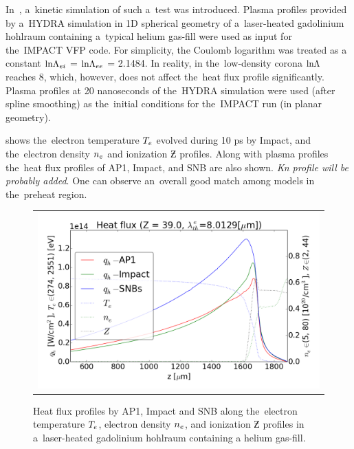 In~\cite{Brodrick_PoP2017}, a~kinetic simulation of such a~test was introduced.
Plasma profiles provided by a~HYDRA simulation in 1D spherical
geometry of a~laser-heated gadolinium hohlraum containing a~typical helium 
gas-fill were used as input for the~IMPACT \cite{Kingham_JCP2004} VFP code.  
For simplicity, the Coulomb logarithm was treated as a
constant $\text{ln}\Lambda_{ei}$ = $\text{ln}\Lambda_{ee}$ = 2.1484. In reality, in the~low-density 
corona $\text{ln}\Lambda$ reaches 8, which, however, does not affect the~heat flux profile 
significantly. Plasma profiles at 20 nanoseconds of the~HYDRA simulation 
were used (after spline smoothing) as the~initial conditions for 
the~IMPACT run (in planar geometry).

 shows the~electron temperature $T_e$ 
evolved during 10 ps by Impact, and the~electron density $n_e$ and 
ionization $\Zbar$ profiles. Along with plasma profiles the~heat flux profiles
of AP1, Impact, and SNB are also shown. 
\textit{Kn profile will be probably added}. One can observe an~overall good
match among models in the~preheat region.

\begin{figure}[tbh]
  \begin{center}
    \begin{tabular}{c}
      \includegraphics[width=\figscale\textwidth]{../VFPdata/GD_Hohlraum/fluxes_10ps.png} 
    \end{tabular}
  \caption{
  Heat flux profiles by AP1, Impact and SNB along 
  the~electron temperature $T_e$, electron density $n_e$, 
  and ionization $\Zbar$ profiles in a~laser-heated gadolinium hohlraum 
  containing a helium gas-fill.
  }
  \label{fig:Gd_VFP_10ps_heatflux}
  \end{center} 
\end{figure}

